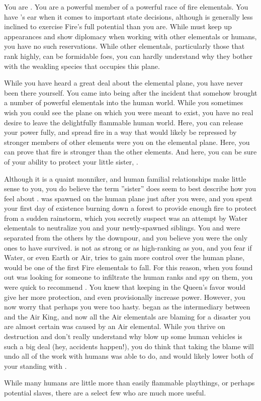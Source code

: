 \documentclass[char]{elementals}
\begin{document}
\name{\cPyro{}}

You are \cPyro{\intro}.  You are a powerful member of a powerful race of fire elementals.  You have \cQueen{\intro}'s ear when it comes to important state decisions, although \cQueen{\they} is generally less inclined to exercise Fire's full potential than you are.  While \cQueen{\they} must keep up appearances and show diplomacy when working with other elementals or humans, you have no such reservations.  While other elementals, particularly those that rank highly, can be formidable foes, you can hardly understand why they bother with the weakling species that occupies this plane.

While you have heard a great deal about the elemental plane, you have never been there yourself.  You came into being after the incident that somehow brought a number of powerful elementals into the human world.  While you sometimes wish you could see the plane on which you were meant to exist, you have no real desire to leave the delightfully flammable human world.  Here, you can release your power fully, and spread fire in a way that would likely be repressed by stronger members of other elements were you on the elemental plane.  Here, you can prove that fire is stronger than the other elements.  And here, you can be sure of your ability to protect your little sister, \cJuliet{\intro}.

Although it is a quaint monniker, and human familial relationships make little sense to you, you do believe the term ''sister'' does seem to best describe how you feel about \cJuliet{}.  \cJuliet{\they} was spawned on the human plane just after you were, and you spent your first day of existence burning down a forest to provide enough fire to protect \cJuliet{\them} from a sudden rainstorm, which you secretly suspect was an attempt by Water elementals to neutralize you and your newly-spawned siblings.  You and \cJuliet{} were separated from the others by the downpour, and you believe you were the only ones to have survived. \cJuliet{\they} is not as strong or as high-ranking as you, and you fear if Water, or even Earth or Air, tries to gain more control over the human plane, \cJuliet{\they} would be one of the first Fire elementals to fall. For this reason, when you found out \cQueen{} was looking for someone to infiltrate the human ranks and spy on them, you were quick to recommend \cJuliet{}.  You knew that keeping \cJuliet{\them} in the Queen's favor would give her more protection, and even provisionally increase  power.  However, you now worry that perhaps you were too hasty.  \cJuliet{} began as the intermediary between \cQueen{} and the Air King, and now all the Air elementals are blaming \cJuliet{\them} for a disaster you are almost certain was caused by an Air elemental.  While you thrive on destruction and don't really understand why blow up some human vehicles is such a big deal (hey, accidents happen!), you do think that \cJuliet{} taking the blame will undo all of the work with humans \cJuliet{\they} was able to do, and would likely lower both of your standing with \cQueen{}.

While many humans are little more than easily flammable playthings, or perhaps potential slaves, there are a select few who are much more useful.  

\end{document}
